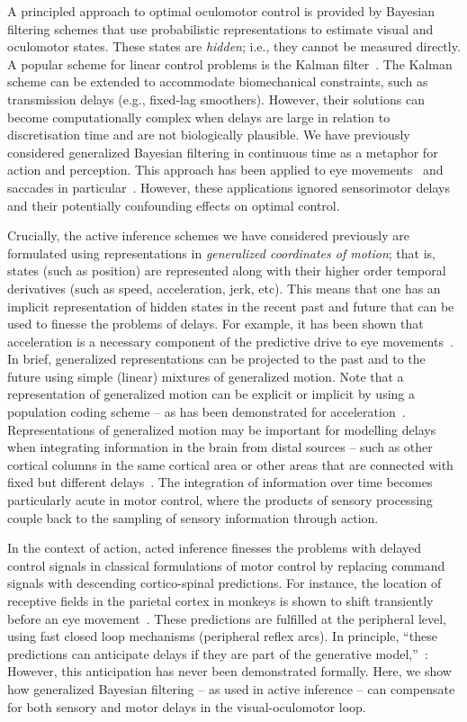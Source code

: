 \documentclass[a4paper]{article} %
\begin{document}
A principled approach to optimal oculomotor control is provided by
Bayesian filtering schemes that use probabilistic representations to
estimate visual and oculomotor states. These states are \emph{hidden};
i.e., they cannot be measured directly. A popular scheme for linear
control problems is the Kalman filter~\citep{Kalman60}. The Kalman scheme
can be extended to accommodate biomechanical constraints, such as
transmission delays (e.g., fixed-lag smoothers). However, their
solutions can become computationally complex when delays are large in
relation to discretisation time and are not biologically plausible. We have previously considered
generalized Bayesian filtering in continuous time as a metaphor for
action and perception. 
This approach has been applied to eye movements~\citep{Friston10a}
and saccades in particular~\citep{Friston12}. However, these
applications ignored sensorimotor delays and their potentially
confounding effects on optimal control.

Crucially, the active inference schemes we have considered
previously are formulated using representations in \emph{generalized
coordinates of motion}; that is, states (such as position) are
represented along with their higher order temporal derivatives (such as
speed, acceleration, jerk, etc). This means that one has an implicit
representation of hidden states in the recent past and future that can
be used to finesse the problems of delays. For example, it has been
shown that acceleration is a necessary component of the predictive drive
to eye movements~\citep{Bennett07}. In brief, generalized
representations can be projected to the past and to the future using
simple (linear) mixtures of generalized motion. Note that a
representation of generalized motion can be explicit or implicit by
using a population coding scheme -- as has been demonstrated for
acceleration~\citep{Lisberger99}. Representations of
generalized motion may be important for modelling delays when
integrating information in the brain from distal sources -- such as
other cortical columns in the same cortical area or other areas that are
connected with fixed but different delays~\citep{Roelfsema97}. The integration of
information over time becomes particularly acute in motor control, where
the products of sensory processing couple back to the sampling of
sensory information through action.

In the context of action, acted inference finesses the problems with
delayed control signals in classical formulations of motor control by
replacing command signals with descending cortico-spinal predictions. 
For instance, the location of receptive fields in the parietal cortex in 
monkeys is shown to shift transiently before an eye movement~\citep{Duhamel92}. %
These predictions are fulfilled at the peripheral level, using fast
closed loop mechanisms (peripheral reflex arcs). In principle, ``these
predictions can anticipate delays if they are part of the generative
model,''~\citep{Friston11}: However, this anticipation has never been
demonstrated formally. Here, we show how generalized Bayesian filtering
-- as used in active inference -- can compensate for both sensory and
motor delays in the visual-oculomotor loop.
\end{document}
